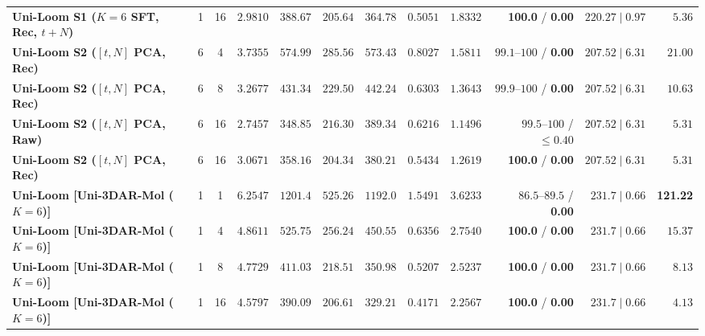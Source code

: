 \documentclass[11pt,a4paper]{article}
\begin{document}
\begin{table}[t]
{\begin{tabular}{@{}lccrrrrrrrrr@{}}
\textbf{Uni-Loom S1 ($K=6$ SFT, Rec, $t+N$)} & 1 & 16 & $2.9810$ & $388.67$ & $205.64$ & $364.78$ & $0.5051$ & $1.8332$ & \textbf{100.0} / \textbf{0.00} & $220.27 \mid \mathbf{0.97}$ & $5.36$ \\
\textbf{Uni-Loom S2 ($[t,N]$ PCA, Rec)} & 6 & 4 & $3.7355$ & $574.99$ & $285.56$ & $573.43$ & $0.8027$ & $1.5811$ & $99.1\text{--}100$ / \textbf{0.00} & $207.52 \mid 6.31$ & $21.00$ \\
\textbf{Uni-Loom S2 ($[t,N]$ PCA, Rec)} & 6 & 8 & $3.2677$ & $431.34$ & $229.50$ & $442.24$ & $0.6303$ & $1.3643$ & $99.9\text{--}100$ / \textbf{0.00} & $207.52 \mid 6.31$ & $10.63$ \\
\textbf{Uni-Loom S2 ($[t,N]$ PCA, Raw)} & 6 & 16 & $2.7457$ & $348.85$ & $216.30$ & $389.34$ & $0.6216$ & $1.1496$ & $99.5\text{--}100$ / $\le0.40$ & $207.52 \mid 6.31$ & $5.31$ \\
\textbf{Uni-Loom S2 ($[t,N]$ PCA, Rec)} & 6 & 16 & $3.0671$ & $358.16$ & $204.34$ & $380.21$ & $0.5434$ & $1.2619$ & \textbf{100.0} / \textbf{0.00} & $207.52 \mid 6.31$ & $5.31$ \\
\midrule
\textbf{Uni-Loom [Uni-3DAR-Mol ($K=6$)]} & 1 & 1 & $6.2547$ & $1201.4$ & $525.26$ & $1192.0$ & $1.5491$ & $3.6233$ & $86.5\text{--}89.5$ / \textbf{0.00} & $231.7 \mid \mathbf{0.66}$ & \textbf{121.22} \\
\textbf{Uni-Loom [Uni-3DAR-Mol ($K=6$)]} & 1 & 4 & $4.8611$ & $525.75$ & $256.24$ & $450.55$ & $0.6356$ & $2.7540$ & \textbf{100.0} / \textbf{0.00} & $231.7 \mid \mathbf{0.66}$ & $15.37$ \\
\textbf{Uni-Loom [Uni-3DAR-Mol ($K=6$)]} & 1 & 8 & $4.7729$ & $411.03$ & $218.51$ & $350.98$ & $0.5207$ & $2.5237$ & \textbf{100.0} / \textbf{0.00} & $231.7 \mid \mathbf{0.66}$ & $8.13$ \\
\textbf{Uni-Loom [Uni-3DAR-Mol ($K=6$)]} & 1 & 16 & $4.5797$ & $390.09$ & $206.61$ & $329.21$ & $0.4171$ & $2.2567$ & \textbf{100.0} / \textbf{0.00} & $231.7 \mid \mathbf{0.66}$ & $4.13$ \\
\bottomrule
\end{tabular}%
}
\vspace{3pt}\par{\footnotesize
}
\end{table}
\end{document}
